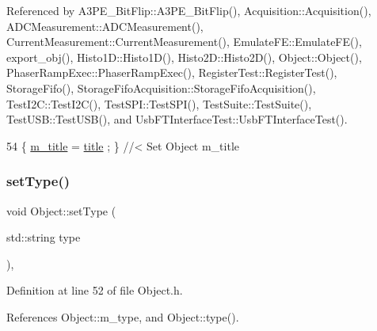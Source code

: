 Referenced by A3\+P\+E\+\_\+\+Bit\+Flip\+::\+A3\+P\+E\+\_\+\+Bit\+Flip(), Acquisition\+::\+Acquisition(), A\+D\+C\+Measurement\+::\+A\+D\+C\+Measurement(), Current\+Measurement\+::\+Current\+Measurement(), Emulate\+F\+E\+::\+Emulate\+F\+E(), export\+\_\+obj(), Histo1\+D\+::\+Histo1\+D(), Histo2\+D\+::\+Histo2\+D(), Object\+::\+Object(), Phaser\+Ramp\+Exec\+::\+Phaser\+Ramp\+Exec(), Register\+Test\+::\+Register\+Test(), Storage\+Fifo(), Storage\+Fifo\+Acquisition\+::\+Storage\+Fifo\+Acquisition(), Test\+I2\+C\+::\+Test\+I2\+C(), Test\+S\+P\+I\+::\+Test\+S\+P\+I(), Test\+Suite\+::\+Test\+Suite(), Test\+U\+S\+B\+::\+Test\+U\+S\+B(), and Usb\+F\+T\+Interface\+Test\+::\+Usb\+F\+T\+Interface\+Test().


\begin{DoxyCode}
54 \{ \hyperlink{classObject_affbeea1953eb5163573b92fad8f75727}{m\_title} = \hyperlink{classObject_a73a0f1a41828fdd8303dd662446fb6c3}{title} ; \} \textcolor{comment}{//< Set Object m\_title}
\end{DoxyCode}
\mbox{\label{classObject_aae534cc9d982bcb9b99fd505f2e103a5}} 
\subsubsection{\texorpdfstring{set\+Type()}{setType()}}
{\footnotesize\ttfamily void Object\+::set\+Type (\begin{DoxyParamCaption}\item[{std\+::string}]{type }\end{DoxyParamCaption})\hspace{0.3cm}{\ttfamily [inline]}, {\ttfamily [inherited]}}



Definition at line 52 of file Object.\+h.



References Object\+::m\+\_\+type, and Object\+::type().



